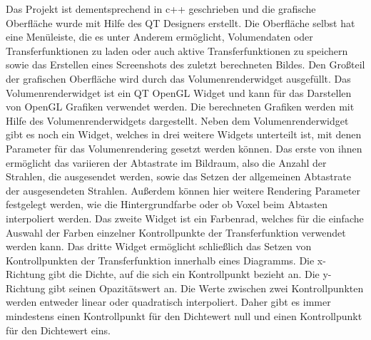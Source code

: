 Das Projekt ist dementsprechend in c++ geschrieben und die grafische Oberfläche wurde mit Hilfe des QT Designers erstellt.
Die Oberfläche selbst hat eine Menüleiste, die es unter Anderem ermöglicht, Volumendaten oder Transferfunktionen zu laden oder auch aktive Transferfunktionen zu speichern sowie das Erstellen eines Screenshots des zuletzt berechneten Bildes.
Den Großteil der grafischen Oberfläche wird durch das Volumenrenderwidget ausgefüllt.
Das Volumenrenderwidget ist ein QT OpenGL Widget und kann für das Darstellen von OpenGL Grafiken verwendet werden.
Die berechneten Grafiken werden mit Hilfe des Volumenrenderwidgets dargestellt.
Neben dem Volumenrenderwidget gibt es noch ein Widget, welches in drei weitere Widgets unterteilt ist, mit denen Parameter für das Volumenrendering gesetzt werden können.
Das erste von ihnen ermöglicht das variieren der Abtastrate im Bildraum, also die Anzahl der Strahlen, die ausgesendet werden, sowie das Setzen der allgemeinen Abtastrate der ausgesendeten Strahlen.
Außerdem können hier weitere Rendering Parameter festgelegt werden, wie die Hintergrundfarbe oder ob Voxel beim Abtasten interpoliert werden.
Das zweite Widget ist ein Farbenrad, welches für die einfache Auswahl der Farben einzelner Kontrollpunkte der Transferfunktion verwendet werden kann.
Das dritte Widget ermöglicht schließlich das Setzen von Kontrollpunkten der Transferfunktion innerhalb eines Diagramms.
Die x-Richtung gibt die Dichte, auf die sich ein Kontrollpunkt bezieht an.
Die y-Richtung gibt seinen Opazitätswert an.
Die Werte zwischen zwei Kontrollpunkten werden entweder linear oder quadratisch interpoliert.
Daher gibt es immer mindestens einen Kontrollpunkt für den Dichtewert null und einen Kontrollpunkt für den Dichtewert eins.

